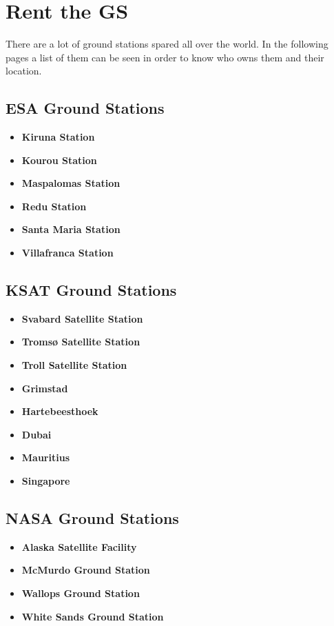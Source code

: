 \section{Rent the GS}
There are a lot of ground stations spared all over the world. In the following pages a list of them can be seen in order to know who owns  them and their location. 
\subsection{ESA Ground Stations}
\begin{itemize}
\item \textbf{Kiruna Station}

\item \textbf{Kourou Station}

\item \textbf{Maspalomas Station}

\item \textbf{Redu Station}

\item \textbf{Santa Maria Station}

\item \textbf{Villafranca Station}

\end{itemize}
\subsection{KSAT Ground Stations}
\begin{itemize}
\item \textbf{Svabard Satellite Station}

\item \textbf{Tromsø Satellite Station}

\item \textbf{Troll Satellite Station}

\item \textbf{Grimstad}

\item \textbf{Hartebeesthoek}

\item \textbf{Dubai}

\item \textbf{Mauritius}

\item \textbf{Singapore}

\end{itemize}
\subsection{NASA Ground Stations}
\begin{itemize}
\item \textbf{Alaska Satellite Facility}

\item \textbf{McMurdo Ground Station}

\item \textbf{Wallops Ground Station}

\item \textbf{White Sands Ground Station}

\end{itemize}
